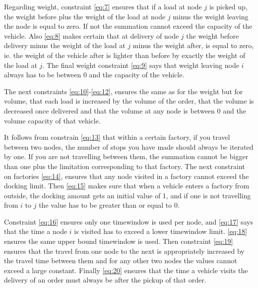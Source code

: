 \documentclass[a4paper,10pt]{article}
\begin{document}
Regarding weight, constraint \ref{eq:7} ensures that if a load at node $j$ is picked up, the weight before plus the weight of the load at node $j$ minus the weight leaving the node is equal to zero. If not the summation cannot exceed the capacity of the vehicle.
Also \ref{eq:8} makes certain that at delivery of node $j$ the weight before delivery minus the weight of the load at $j$ minus the weight after, is equal to zero, ie. the weight of the vehicle after is lighter than before by exactly the weight of the load at $j$. 
The final weight constraint \ref{eq:9} says that weight leaving node $i$ always has to be between $0$ and the capacity of the vehicle. \par

The next constraints \ref{eq:10}-\ref{eq:12}, ensures the same as for the weight but for volume, that each load is increased by the volume of the order, that the volume is decreased once delivered and that the volume at any node is between $0$ and the volume capacity of that vehicle.

It follows from constrain \ref{eq:13} that within a certain factory, if you travel between two nodes, the number of stops you have made should always be iterated by one. 
If you are not travelling between them, the summation cannot be bigger than one plus the limitation corresponding to that factory.
The next constraint on factories \ref{eq:14}, ensures that any node visited in a factory cannot exceed the docking limit.
Then \ref{eq:15} makes sure that when a vehicle enters a factory from outside, the docking amount gets an initial value of 1, and if one is not travelling from $i$ to $j$ the value has to be greater than or equal to 0. \par

Constraint \ref{eq:16} ensures only one timewindow is used per node, and \ref{eq:17} says that the time a node $i$ is visited has to exceed a lower timewindow limit.
\ref{eq:18} ensures the same upper bound timewindow is used. 
Then constraint \ref{eq:19} ensures that the travel from one node to the next is appropriately increased by the travel time between them and for any other two nodes the values cannot exceed a large constant.
Finally \ref{eq:20} ensures that the time a vehicle visits the delivery of an order must always be after the pickup of that order. \par
\end{document}

